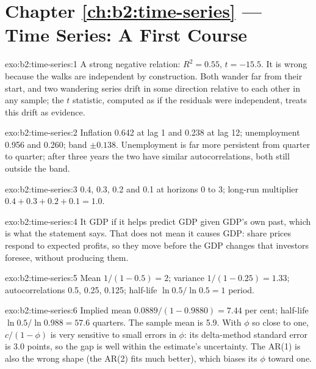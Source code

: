 \section*{Chapter \ref{ch:b2:time-series} --- Time Series: A First Course}

\begin{solution}{exo:b2:time-series:1}
A strong negative relation: $R^2 = 0.55$, $t = -15.5$. It is wrong because the walks are independent by construction.
Both wander far from their start, and two wandering series drift in some direction relative to each other in any sample;
the $t$ statistic, computed as if the residuals were independent, treats this drift as evidence.
\end{solution}

\begin{solution}{exo:b2:time-series:2}
Inflation 0.642 at lag 1 and 0.238 at lag 12; unemployment 0.956 and 0.260; band $\pm0.138$. Unemployment is far more
persistent from quarter to quarter; after three years the two have similar autocorrelations, both still outside the band.
\end{solution}

\begin{solution}{exo:b2:time-series:3}
 0.4, 0.3, 0.2 and 0.1 at horizons 0 to 3; long-run multiplier $0.4 + 0.3 + 0.2 + 0.1 = 1.0$.
\end{solution}

\begin{solution}{exo:b2:time-series:4}
It  GDP if it helps predict GDP given GDP's own past, which is what the statement says. That does not mean it
causes GDP: share prices respond to expected profits, so they move before the GDP changes that investors foresee, without
producing them.
\end{solution}

\begin{solution}{exo:b2:time-series:5}
Mean $1/(1 - 0.5) = 2$; variance $1/(1 - 0.25) = 1.33$; autocorrelations 0.5, 0.25, 0.125; half-life $\ln 0.5/\ln 0.5 = 1$
period.
\end{solution}

\begin{solution}{exo:b2:time-series:6}
Implied mean $0.0889/(1 - 0.9880) = 7.44$ per cent; half-life $\ln 0.5/\ln 0.988 = 57.6$ quarters. The sample mean is 5.9.
With $\phi$ so close to one, $c/(1 - \phi)$ is very sensitive to small errors in $\phi$: its delta-method standard error is
3.0 points, so the gap is well within the estimate's uncertainty. The AR(1) is also the wrong shape (the AR(2) fits much
better), which biases its $\phi$ toward one.
\end{solution}

